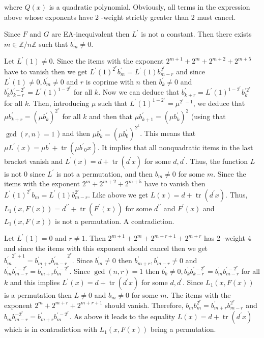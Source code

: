 \documentclass[10pt]{article}
\begin{document}
where $Q(x)$ is a quadratic polynomial. Obviously, all terms in the expression above whose exponents have 2 -weight strictly greater than 2 must cancel.

Since $F$ and $G$ are EA-inequivalent then $L^{\prime}$ is not a constant. Then there exists $m \in \mathbb{Z} / n \mathbb{Z}$ such that $b_{m}^{\prime} \neq 0$.

Let $L^{\prime}(1) \neq 0$. Since the items with the exponent $2^{m+1}+2^{m}+2^{m+2}+2^{m+5}$ have to vanish then we get $L^{\prime}(1)^{2^{r}} b_{m}^{\prime}=L^{\prime}(1) b_{m-r}^{2^{r}}$ and since $L^{\prime}(1) \neq 0, b_{m}^{\prime} \neq 0$ and $r$ is coprime with $n$ then $b_{k}^{\prime} \neq 0$ and $b_{k}^{\prime} b_{k-r}^{\prime-2^{r}}=L^{\prime}(1)^{1-2^{r}}$ for all $k$. Now we can deduce that $b_{k+r}^{\prime}=L^{\prime}(1)^{1-2^{r}} b_{k}^{\prime 2^{r}}$ for all $k$. Then, introducing $\mu$ such that $L^{\prime}(1)^{1-2^{r}}=\mu^{2^{r}-1}$, we deduce that $\mu b_{k+r}^{\prime}=\left(\mu b_{k}^{\prime}\right)^{2^{r}}$ for all $k$ and then that $\mu b_{k+1}^{\prime}= \left(\mu b_{k}^{\prime}\right)^{2}$ (using that $\operatorname{gcd}(r, n)=1$ ) and then $\mu b_{k}^{\prime}=\left(\mu b_{0}^{\prime}\right)^{2^{k}}$. This means that $\mu L^{\prime}(x)=\mu b^{\prime}+\operatorname{tr}\left(\mu b^{\prime}{ }_{0} x\right)$. It implies that all nonquadratic items in the last bracket vanish and $L^{\prime}(x)=d+\operatorname{tr}\left(d^{\prime} x\right)$ for some $d, d^{\prime}$. Thus, the function $L$ is not 0 since $L^{\prime}$ is not a permutation, and then $b_{m} \neq 0$ for some $m$. Since the items with the exponent $2^{m}+2^{m+2}+2^{m+5}$ have to vanish then $L^{\prime}(1)^{2^{r}} b_{m}=L^{\prime}(1) b_{m-r}^{2^{r}}$. Like above we get $L(x)=d+\operatorname{tr}\left(d^{\prime} x\right)$. Thus, $L_{1}(x, F(x))=d^{\prime \prime}+\operatorname{tr}\left(F^{\prime}(x)\right)$ for some $d^{\prime \prime}$ and $F^{\prime}(x)$ and $L_{1}(x, F(x))$ is not a permutation. A contradiction.

Let $L^{\prime}(1)=0$ and $r \neq 1$. Then $2^{m+1}+2^{m}+2^{m+r+1}+2^{m+r}$ has 2 -weight 4 and since the items with this exponent should cancel then we get ${b_{m}^{\prime}}^{2^{r}+1}=b_{m+r}^{\prime}{b_{m-r}^{\prime}}^{2^{r}}$. Since $b_{m}^{\prime} \neq 0$ then $b_{m+r}^{\prime}, b_{m-r}^{\prime} \neq 0$ and $b_{m}^{\prime} b_{m-r}^{\prime-2^{r}}=b_{m+r}^{\prime} b_{m}^{\prime-2^{r}}$. Since $\operatorname{gcd}(n, r)=1$ then $b_{k}^{\prime} \neq 0, b_{k}^{\prime} b_{k-r}^{\prime-2^{r}}=b_{m}^{\prime} b_{m-r}^{\prime-2^{r}}$ for all $k$ and this implies $L^{\prime}(x)=d+\operatorname{tr}\left(d^{\prime} x\right)$ for some $d, d^{\prime}$. Since $L_{1}(x, F(x))$ is a permutation then $L \neq 0$ and $b_{m} \neq 0$ for some $m$. The items with the exponent $2^{m}+2^{m+r}+2^{m+r+1}$ should vanish. Therefore, $b_{m} b_{m}^{2^{r}}=b_{m+r}^{\prime} b_{m-r}^{2^{r}}$ and\\
$b_{m} b_{m-r}^{-2^{r}}=b_{m+r}^{\prime} b_{m}^{\prime-2^{r}}$. As above it leads to the equality $L(x)=d+\operatorname{tr}\left(d^{\prime} x\right)$ which is in contradiction with $L_{1}(x, F(x))$ being a permutation.
\end{document}
